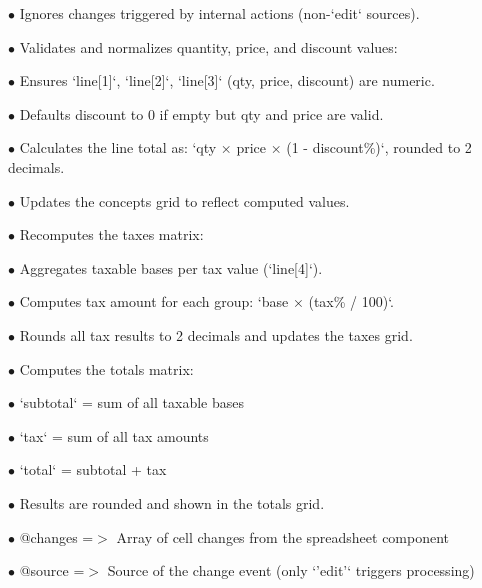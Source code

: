 \documentclass[a4paper]{article}
\begin{document}
\begin{compactitem}
\item[\color{myblue}$\bullet$] Ignores changes triggered by internal actions (non-`edit` sources).
\item[\color{myblue}$\bullet$] Validates and normalizes quantity, price, and discount values:
    \begin{compactitem}
    \item[\color{myblue}$\bullet$] Ensures `line[1]`, `line[2]`, `line[3]` (qty, price, discount) are numeric.
    \item[\color{myblue}$\bullet$] Defaults discount to 0 if empty but qty and price are valid.
    \end{compactitem}
\item[\color{myblue}$\bullet$] Calculates the line total as: `qty × price × (1 - discount\%)`, rounded to 2 decimals.
\item[\color{myblue}$\bullet$] Updates the concepts grid to reflect computed values.
\item[\color{myblue}$\bullet$] Recomputes the taxes matrix:
    \begin{compactitem}
    \item[\color{myblue}$\bullet$] Aggregates taxable bases per tax value (`line[4]`).
    \item[\color{myblue}$\bullet$] Computes tax amount for each group: `base × (tax\% / 100)`.
    \end{compactitem}
\item[\color{myblue}$\bullet$] Rounds all tax results to 2 decimals and updates the taxes grid.
\item[\color{myblue}$\bullet$] Computes the totals matrix:
    \begin{compactitem}
    \item[\color{myblue}$\bullet$] `subtotal` = sum of all taxable bases
    \item[\color{myblue}$\bullet$] `tax` = sum of all tax amounts
    \item[\color{myblue}$\bullet$] `total` = subtotal + tax
    \item[\color{myblue}$\bullet$] Results are rounded and shown in the totals grid.
    \end{compactitem}
\end{compactitem}

\begin{compactitem}
\item[\color{myblue}$\bullet$] @changes =$>$ Array of cell changes from the spreadsheet component
\item[\color{myblue}$\bullet$] @source  =$>$ Source of the change event (only `'edit'` triggers processing)
\end{compactitem}
\end{document}
